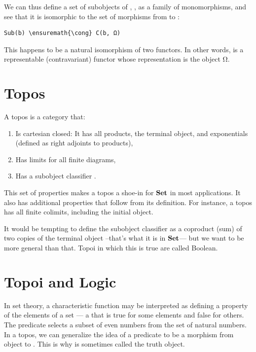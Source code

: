 We can thus define a set of subobjects of , ,
as a family of monomorphisms, and see that it is isomorphic to the set
of morphisms from  to :

\begin{Verbatim}[commandchars=\\\{\}]
Sub(b) \ensuremath{\cong} C(b, Ω)
\end{Verbatim}
This happens to be a natural isomorphism of two functors. In other
words,  is a representable (contravariant) functor whose
representation is the object Ω.

\section{Topos}\label{topos}

A topos is a category that:

\begin{enumerate}
\tightlist
\item
  Is cartesian closed: It has all products, the terminal object, and
  exponentials (defined as right adjoints to products),
\item
  Has limits for all finite diagrams,
\item
  Has a subobject classifier .
\end{enumerate}

This set of properties makes a topos a shoe-in for $\mathbf{Set}$ in most
applications. It also has additional properties that follow from its
definition. For instance, a topos has all finite colimits, including the
initial object.

It would be tempting to define the subobject classifier as a coproduct
(sum) of two copies of the terminal object --that's what it is in
$\mathbf{Set}$--- but we want to be more general than that. Topoi in which
this is true are called Boolean.

\section{Topoi and Logic}\label{topoi-and-logic}

In set theory, a characteristic function may be interpreted as defining
a property of the elements of a set --- a  that is true
for some elements and false for others. The predicate 
selects a subset of even numbers from the set of natural numbers. In a
topos, we can generalize the idea of a predicate to be a morphism from
object  to . This is why  is sometimes
called the truth object.

